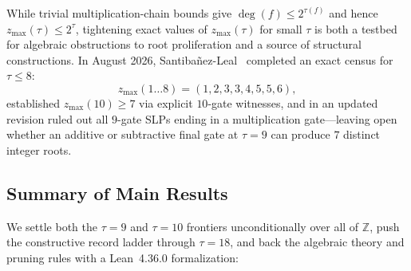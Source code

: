 \documentclass[11pt]{article}
\newcommand{\Z}{\mathbb{Z}}
\newcommand{\zmax}{z_{\max}}
\begin{document}
While trivial multiplication-chain bounds give $\deg(f) \le 2^{\tau(f)}$ and hence $\zmax(\tau) \le 2^\tau$, tightening exact values of $\zmax(\tau)$ for small $\tau$ is both a testbed for algebraic obstructions to root proliferation and a source of structural constructions. In August 2026, Santiba\~{n}ez-Leal~\cite{SantibanezLeal2026} completed an exact census for $\tau \le 8$:
\[
  \zmax(1 \dots 8) = (1, 2, 3, 3, 4, 5, 5, 6),
\]
established $\zmax(10) \ge 7$ via explicit $10$-gate witnesses, and in an updated revision ruled out all $9$-gate SLPs ending in a multiplication gate---leaving open whether an additive or subtractive final gate at $\tau = 9$ can produce $7$ distinct integer roots.

\subsection{Summary of Main Results}
We settle both the $\tau = 9$ and $\tau = 10$ frontiers unconditionally over all of $\Z$, push the constructive record ladder through $\tau = 18$, and back the algebraic theory and pruning rules with a Lean~4.36.0 formalization:
\end{document}
